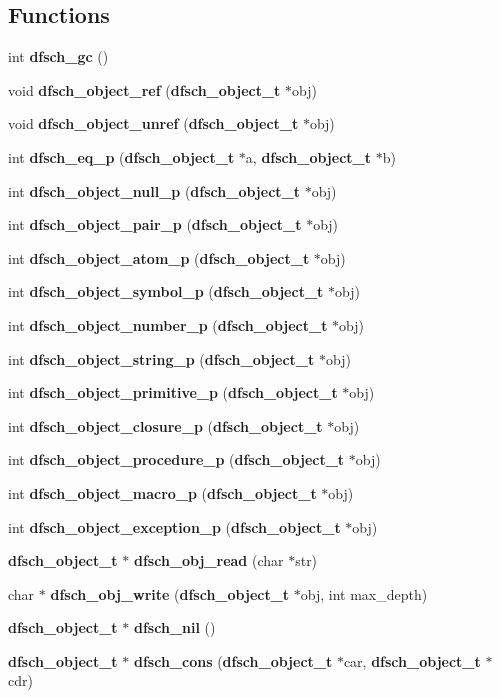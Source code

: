 \subsection*{Functions}
\begin{CompactItemize}
\item 
int {\bf dfsch\_\-gc} ()
\item 
void {\bf dfsch\_\-object\_\-ref} ({\bf dfsch\_\-object\_\-t} $\ast$obj)
\item 
void {\bf dfsch\_\-object\_\-unref} ({\bf dfsch\_\-object\_\-t} $\ast$obj)
\item 
int {\bf dfsch\_\-eq\_\-p} ({\bf dfsch\_\-object\_\-t} $\ast$a, {\bf dfsch\_\-object\_\-t} $\ast$b)
\item 
int {\bf dfsch\_\-object\_\-null\_\-p} ({\bf dfsch\_\-object\_\-t} $\ast$obj)
\item 
int {\bf dfsch\_\-object\_\-pair\_\-p} ({\bf dfsch\_\-object\_\-t} $\ast$obj)
\item 
int {\bf dfsch\_\-object\_\-atom\_\-p} ({\bf dfsch\_\-object\_\-t} $\ast$obj)
\item 
int {\bf dfsch\_\-object\_\-symbol\_\-p} ({\bf dfsch\_\-object\_\-t} $\ast$obj)
\item 
int {\bf dfsch\_\-object\_\-number\_\-p} ({\bf dfsch\_\-object\_\-t} $\ast$obj)
\item 
int {\bf dfsch\_\-object\_\-string\_\-p} ({\bf dfsch\_\-object\_\-t} $\ast$obj)
\item 
int {\bf dfsch\_\-object\_\-primitive\_\-p} ({\bf dfsch\_\-object\_\-t} $\ast$obj)
\item 
int {\bf dfsch\_\-object\_\-closure\_\-p} ({\bf dfsch\_\-object\_\-t} $\ast$obj)
\item 
int {\bf dfsch\_\-object\_\-procedure\_\-p} ({\bf dfsch\_\-object\_\-t} $\ast$obj)
\item 
int {\bf dfsch\_\-object\_\-macro\_\-p} ({\bf dfsch\_\-object\_\-t} $\ast$obj)
\item 
int {\bf dfsch\_\-object\_\-exception\_\-p} ({\bf dfsch\_\-object\_\-t} $\ast$obj)
\item 
{\bf dfsch\_\-object\_\-t} $\ast$ {\bf dfsch\_\-obj\_\-read} (char $\ast$str)
\item 
char $\ast$ {\bf dfsch\_\-obj\_\-write} ({\bf dfsch\_\-object\_\-t} $\ast$obj, int max\_\-depth)
\item 
{\bf dfsch\_\-object\_\-t} $\ast$ {\bf dfsch\_\-nil} ()
\item 
{\bf dfsch\_\-object\_\-t} $\ast$ {\bf dfsch\_\-cons} ({\bf dfsch\_\-object\_\-t} $\ast$car, {\bf dfsch\_\-object\_\-t} $\ast$cdr)

\end{CompactItemize}
